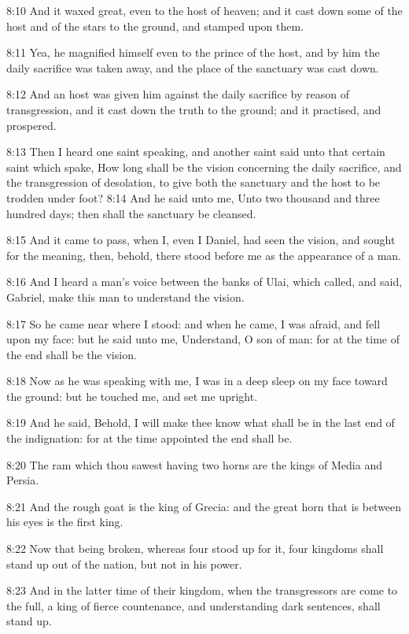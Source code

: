 8:10 And it waxed great, even to the host of heaven; and it cast down some of the host and of the stars to the ground, and stamped upon them.

8:11 Yea, he magnified himself even to the prince of the host, and by him the daily sacrifice was taken away, and the place of the sanctuary was cast down.

8:12 And an host was given him against the daily sacrifice by reason of transgression, and it cast down the truth to the ground; and it practised, and prospered.

8:13 Then I heard one saint speaking, and another saint said unto that certain saint which spake, How long shall be the vision concerning the daily sacrifice, and the transgression of desolation, to give both the sanctuary and the host to be trodden under foot?  8:14 And he said unto me, Unto two thousand and three hundred days; then shall the sanctuary be cleansed.

8:15 And it came to pass, when I, even I Daniel, had seen the vision, and sought for the meaning, then, behold, there stood before me as the appearance of a man.

8:16 And I heard a man's voice between the banks of Ulai, which called, and said, Gabriel, make this man to understand the vision.

8:17 So he came near where I stood: and when he came, I was afraid, and fell upon my face: but he said unto me, Understand, O son of man: for at the time of the end shall be the vision.

8:18 Now as he was speaking with me, I was in a deep sleep on my face toward the ground: but he touched me, and set me upright.

8:19 And he said, Behold, I will make thee know what shall be in the last end of the indignation: for at the time appointed the end shall be.

8:20 The ram which thou sawest having two horns are the kings of Media and Persia.

8:21 And the rough goat is the king of Grecia: and the great horn that is between his eyes is the first king.

8:22 Now that being broken, whereas four stood up for it, four kingdoms shall stand up out of the nation, but not in his power.

8:23 And in the latter time of their kingdom, when the transgressors are come to the full, a king of fierce countenance, and understanding dark sentences, shall stand up.

